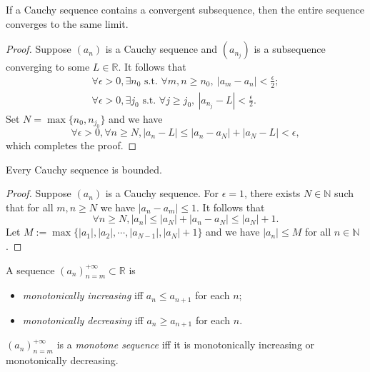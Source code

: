 \begin{lem}
  \label{lem:CauchySubseqConvergence}
  If a Cauchy sequence contains a convergent subsequence,
  then the entire sequence converges to the same limit.
\end{lem}
\begin{proof}
  Suppose $(a_n)$ is a Cauchy sequence
  and $(a_{n_j})$ is a subsequence converging to some $L\in \mathbb{R}$.
  It follows that
  \begin{displaymath}
    \begin{array}{l}
    \forall \epsilon>0, \exists n_0 \text{ s.t. }
    \forall m,n\ge n_0,\  |a_m-a_n|< \frac{\epsilon}{2};
    \\
    \forall \epsilon>0, \exists j_0 \text{ s.t. }
    \forall j\ge j_0,\  |a_{n_j}-L|< \frac{\epsilon}{2}.
    \end{array}
  \end{displaymath}
  Set $N=\max\{n_0, n_{j_0}\}$ and we have
  \begin{displaymath}
    \forall \epsilon>0, \forall n\ge N, 
    |a_{n}-L|\le |a_{n}-a_N|+ |a_{N}-L|
    < \epsilon,
  \end{displaymath}
  which completes the proof.
\end{proof}

\begin{lem}
  \label{lem:CauchySeqIsBounded}
  Every Cauchy sequence is bounded.
\end{lem}
\begin{proof}
  Suppose $(a_{n})$ is a Cauchy sequence. For $\epsilon=1$,
  there exists $N\in \mathbb{N}$ such that for all $m,n\ge N$ we have
  $|a_{n}-a_{m}|\le 1$. It follows that
  \begin{displaymath}
    \forall n\ge N, |a_{n}|\le |a_{N}|+|a_{n}-a_{N}|\le |a_{N}|+1.
  \end{displaymath}
  Let $M:=\max\{|a_{1}|,|a_{2}|,\cdots,|a_{N-1}|,|a_{N}|+1\}$ and
  we have $|a_{n}|\le M$ for all $n\in \mathbb{N}$.
\end{proof}

\begin{defn}
  \label{defn:monotoneSequences}
  A sequence $(a_n)_{n=m}^{+\infty} \subset \mathbb{R}$ is
  \begin{itemize}\itemsep0em
  \item \emph{monotonically increasing} iff
    $a_n\le a_{n+1}$ for each $n$; 
  \item \emph{monotonically decreasing} iff
    $a_n\ge a_{n+1}$ for each $n$. 
  \end{itemize}
  $(a_n)_{n=m}^{+\infty}$ is a \emph{monotone sequence}
  iff it is monotonically increasing or monotonically decreasing.
\end{defn}

